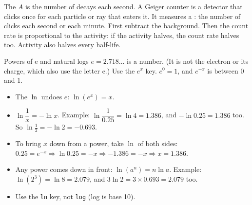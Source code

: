 The  $A$ is the number of decays each second. A Geiger counter is a
detector that clicks once for each particle or ray that enters it. It measures a
: the number of clicks each second or each minute. First subtract
the background. Then the count rate is proportional to the activity: if the activity
halves, the count rate halves too. Activity also halves every half-life.

\begin{toolkit}{Powers of e and natural logs}
$e = 2.718\ldots$ is a number. (It is not the electron or its charge, which also use
the letter e.) Use the $e^x$ key. $e^{0} = 1$, and $e^{-x}$ is between 0 and 1.
\begin{itemize}
  \item The  $\ln$ undoes $e$: $\ln(e^{x}) = x$.
  \item $\ln\dfrac{1}{x} = -\ln x$. Example: $\ln\dfrac{1}{0.25} = \ln 4 = 1.386$, and
        $-\ln 0.25 = 1.386$ too. So $\ln\tfrac{1}{2} = -\ln 2 = -0.693$.
  \item To bring $x$ down from a power, take $\ln$ of both sides:
        $0.25 = e^{-x} \Rightarrow \ln 0.25 = -x \Rightarrow -1.386 = -x
        \Rightarrow x = 1.386$.
  \item Any power comes down in front: $\ln(a^{n}) = n\ln a$. Example:
        $\ln(2^{3}) = \ln 8 = 2.079$, and $3\ln 2 = 3 \times 0.693 = 2.079$ too.
  \item Use the \texttt{ln} key, not \texttt{log} (log is base 10).
\end{itemize}
\end{toolkit}


